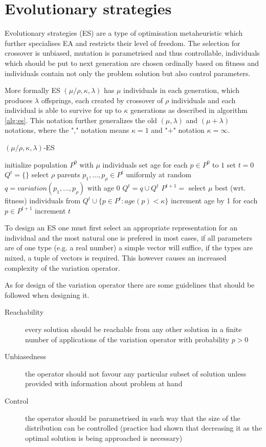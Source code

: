 \section{Evolutionary strategies}
\label{sec:es}
Evolutionary strategies (ES) are a type of optimisation metaheuristic which further specialises EA and restricts their level of freedom. The selection for crossover is unbiased, mutation is parametrised and thus controllable, individuals which should be put to next generation are chosen ordinally based on fitness and individuals contain not only the problem solution but also control parameters.

More formally ES $(\mu / \rho,\kappa,\lambda)$ has $\mu$ individuals in each generation, which produces $\lambda$ offsprings, each created by crossover of $\rho$ individuals and each individual is able to survive for up to $\kappa$ generations as described in algorithm \ref{alg:es}. This notation further generalizes the old $(\mu,\lambda)$ and $(\mu+\lambda)$ notations, where the "," notation means $\kappa=1$ and "+" notation $\kappa=\infty$. 
\begin{algorithm}
\begin{algorithmic}[1]
\caption{$(\mu / \rho,\kappa,\lambda)$-ES}
\label{alg:es}
    \State initialize population $P^0$ with $\mu$ individuals
    \State set age for each $p\in P^0$ to $1$
    \State set $t=0$
    \Repeat
        \State $Q^t = \{\}$
            \State select $\rho$ parents $p_1,\dots,p_\rho \in P^t$ uniformly at random
            \State $q = variation(p_1,\dots,p_\rho)$ with age $0$
            \State $Q^t = q \cup Q^t$
        \EndFor
        \State $P^{t+1} =$ select $\mu$ best (wrt. fitness) individuals from $Q^t\cup \{p \in P^t: age(p)<\kappa\}$
        \State increment age by 1 for each $p \in P^{t+1}$
        \State increment $t$
\end{algorithmic}
\end{algorithm}

To design an ES one must first select an appropriate representation for an individual and the most natural one is prefered in most cases, if all parameters are of one type (e.g. a real number) a simple vector will suffice, if the types are mixed, a tuple of vectors is required. This however causes an increased complexity of the variation operator.

As for design of the variation operator there are some guidelines that should be followed when designing it.
\begin{description}
    \item[Reachability] every solution should be reachable from any other solution in a finite number of applications of the variation operator with probability $p > 0$
    \item[Unbiasedness] the operator should not favour any particular subset of solution unless provided with information about problem at hand
    \item[Control] the operator should be parametrised in such way that the size of the distribution can be controlled (practice had shown that decreasing it as the optimal solution is being approached is necessary) 
\end{description}

